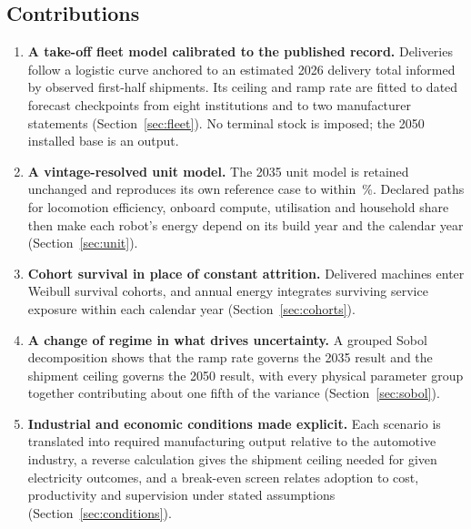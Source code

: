 \documentclass[11pt]{article}
\newcommand{\secref}[1]{Section~\ref{#1}}
\begin{document}
\subsection{Contributions}
\begin{enumerate}[leftmargin=*]
\item \textbf{A take-off fleet model calibrated to the published record.} Deliveries follow a logistic curve anchored to an estimated 2026 delivery total informed by observed first-half shipments. Its ceiling and ramp rate are fitted to dated forecast checkpoints from eight institutions and to two manufacturer statements (\secref{sec:fleet}). No terminal stock is imposed; the 2050 installed base is an output.
\item \textbf{A vintage-resolved unit model.} The 2035 unit model is retained unchanged and reproduces its own reference case to within \LegacyErr\,\%. Declared paths for locomotion efficiency, onboard compute, utilisation and household share then make each robot's energy depend on its build year and the calendar year (\secref{sec:unit}).
\item \textbf{Cohort survival in place of constant attrition.} Delivered machines enter Weibull survival cohorts, and annual energy integrates surviving service exposure within each calendar year (\secref{sec:cohorts}).
\item \textbf{A change of regime in what drives uncertainty.} A grouped Sobol decomposition shows that the ramp rate governs the 2035 result and the shipment ceiling governs the 2050 result, with every physical parameter group together contributing about one fifth of the variance (\secref{sec:sobol}).
\item \textbf{Industrial and economic conditions made explicit.} Each scenario is translated into required manufacturing output relative to the automotive industry, a reverse calculation gives the shipment ceiling needed for given electricity outcomes, and a break-even screen relates adoption to cost, productivity and supervision under stated assumptions (\secref{sec:conditions}).
\end{enumerate}
\end{document}
